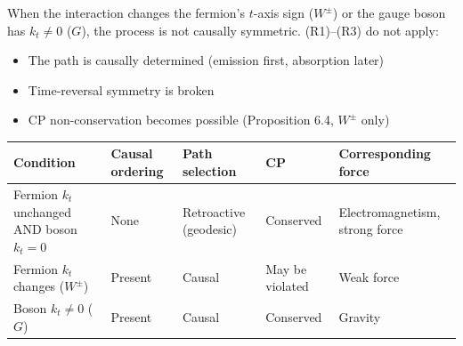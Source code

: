 \documentclass[
  a4paper,11pt]{article}
\newcounter{none}
\providecommand{\tightlist}{%
  \setlength{\itemsep}{0pt}\setlength{\parskip}{0pt}}
\theoremstyle{definition}
\theoremstyle{remark}
\begin{document}
When the interaction changes the fermion's \(t\)-axis sign (\(W^{\pm}\))
or the gauge boson has \(k_t \neq 0\) (\(G\)), the process is not
causally symmetric. (R1)--(R3) do not apply:

\begin{itemize}
\tightlist
\item
  The path is causally determined (emission first, absorption later)
\item
  Time-reversal symmetry is broken
\item
  CP non-conservation becomes possible (Proposition 6.4, \(W^{\pm}\)
  only)
\end{itemize}

{\def\LTcaptype{none} %
\begin{longtable}[]{@{}
  >{\raggedright\arraybackslash}p{}
  >{\raggedright\arraybackslash}p{}
  >{\raggedright\arraybackslash}p{}
  >{\raggedright\arraybackslash}p{}
  >{\raggedright\arraybackslash}p{}@{}}
\toprule\noalign{}
\begin{minipage}[b]{\linewidth}\raggedright
Condition
\end{minipage} & \begin{minipage}[b]{\linewidth}\raggedright
Causal ordering
\end{minipage} & \begin{minipage}[b]{\linewidth}\raggedright
Path selection
\end{minipage} & \begin{minipage}[b]{\linewidth}\raggedright
CP
\end{minipage} & \begin{minipage}[b]{\linewidth}\raggedright
Corresponding force
\end{minipage} \\
\midrule\noalign{}
\endhead
\bottomrule\noalign{}
\endlastfoot
Fermion \(k_t\) unchanged AND boson \(k_t = 0\) & None & Retroactive
(geodesic) & Conserved & Electromagnetism, strong force \\
Fermion \(k_t\) changes (\(W^{\pm}\)) & Present & Causal & May be
violated & Weak force \\
Boson \(k_t \neq 0\) (\(G\)) & Present & Causal & Conserved & Gravity \\
\end{longtable}
}
\end{document}
